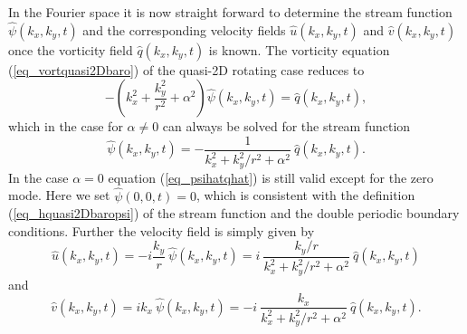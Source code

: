 In the Fourier space it is now straight forward to determine
the stream function $\hat{\psi}(k_{x},k_{y},t)$ and the corresponding
velocity fields $\hat{u}(k_{x},k_{y},t)$ and $\hat{v}(k_{x},k_{y},t)$ once
the vorticity field $\hat{q}(k_{x},k_{y},t)$ is known. The
vorticity equation (\ref{eq_vortquasi2Dbaro}) of the quasi-2D
rotating case reduces to
\begin{equation} \label{eq_fourvortquasi2Dbaro}
 -\left(k_{x}^{2} + \frac{k_{y}^{2}}{r^{2}} + \alpha^{2} \right) 
  \hat{\psi}(k_{x},k_{y},t)
  =
 \hat{q}(k_{x},k_{y},t),
\end{equation}
which in the case for $\alpha \ne 0$ can always be solved for the
stream function
\begin{equation} \label{eq_psihatqhat}
  \hat{\psi}(k_{x},k_{y},t)
  =
  - \frac{1}
  {k_{x}^{2} + k_{y}^{2}/r^{2} + \alpha^{2}} \
  \hat{q}(k_{x},k_{y},t).
\end{equation}
In the case $\alpha = 0$ equation (\ref{eq_psihatqhat}) is still
valid except for the zero mode. Here we set $\hat{\psi}(0,0,t) = 0$,
which is consistent with the definition (\ref{eq_hquasi2Dbaropsi})
of the stream function and the double periodic boundary conditions.
Further the velocity field is simply given by
\begin{equation} \label{eq_uhat}
 \hat{u}(k_{x},k_{y},t) 
  =  -i \frac{k_{y}}{r} \ \hat{\psi}(k_{x},k_{y},t)
  = i \ \frac{k_{y}/r }
  {k_{x}^{2} + k_{y}^{2}/r^{2} + \alpha^{2}} \
  \hat{q}(k_{x},k_{y},t)
\end{equation}
and
\begin{equation} \label{eq_vhat}
 \hat{v}(k_{x},k_{y},t) = i k_{x} \ \hat{\psi}(k_{x},k_{y},t)
  = - i \ \frac{k_{x}}
  {k_{x}^{2} + k_{y}^{2}/r^{2} + \alpha^{2}} \
  \hat{q}(k_{x},k_{y},t).
\end{equation}

